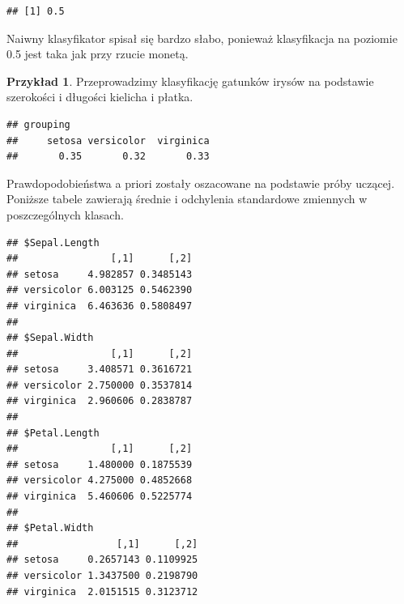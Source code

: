 \documentclass[
]{book}
\newenvironment{Shaded}{\begin{snugshade}}{\end{snugshade}}
\newcommand{\AttributeTok}[1]{\textcolor[rgb]{0.13,0.29,0.53}{#1}}
\newcommand{\DecValTok}[1]{\textcolor[rgb]{0.00,0.00,0.81}{#1}}
\newcommand{\FunctionTok}[1]{\textcolor[rgb]{0.13,0.29,0.53}{\textbf{#1}}}
\newcommand{\NormalTok}[1]{#1}
\newcommand{\OtherTok}[1]{\textcolor[rgb]{0.56,0.35,0.01}{#1}}
\newcommand{\SpecialCharTok}[1]{\textcolor[rgb]{0.81,0.36,0.00}{\textbf{#1}}}
\theoremstyle{plain}
\theoremstyle{definition}
\theoremstyle{definition}
\theoremstyle{definition}
\newtheorem{example}{Przykład}[chapter]
\theoremstyle{definition}
\theoremstyle{definition}
\theoremstyle{remark}
\begin{document}
\begin{verbatim}
## [1] 0.5
\end{verbatim}

Naiwny klasyfikator spisał się bardzo słabo, ponieważ klasyfikacja na poziomie 0.5 jest taka jak przy rzucie monetą.

\begin{example}
\protect\hypertarget{exm:unnamed-chunk-78}{}\label{exm:unnamed-chunk-78}Przeprowadzimy klasyfikację gatunków irysów na podstawie szerokości i długości kielicha i płatka.
\end{example}

\begin{Shaded}
\end{Shaded}

\begin{verbatim}
## grouping
##     setosa versicolor  virginica 
##       0.35       0.32       0.33
\end{verbatim}

Prawdopodobieństwa a priori zostały oszacowane na podstawie próby uczącej. Poniższe tabele zawierają średnie i odchylenia standardowe zmiennych w poszczególnych klasach.

\begin{Shaded}
\end{Shaded}

\begin{verbatim}
## $Sepal.Length
##                [,1]      [,2]
## setosa     4.982857 0.3485143
## versicolor 6.003125 0.5462390
## virginica  6.463636 0.5808497
## 
## $Sepal.Width
##                [,1]      [,2]
## setosa     3.408571 0.3616721
## versicolor 2.750000 0.3537814
## virginica  2.960606 0.2838787
## 
## $Petal.Length
##                [,1]      [,2]
## setosa     1.480000 0.1875539
## versicolor 4.275000 0.4852668
## virginica  5.460606 0.5225774
## 
## $Petal.Width
##                 [,1]      [,2]
## setosa     0.2657143 0.1109925
## versicolor 1.3437500 0.2198790
## virginica  2.0151515 0.3123712
\end{verbatim}
\end{document}
